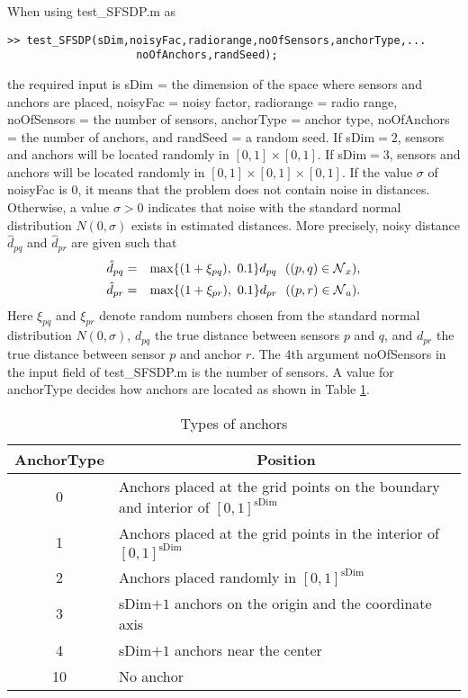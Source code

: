 \documentclass[12pt]{article}
\def\NC{\mbox{$\cal N$}}
\begin{document}
           
When using test\_SFSDP.m as
\begin{verbatim}
>> test_SFSDP(sDim,noisyFac,radiorange,noOfSensors,anchorType,... 
                    noOfAnchors,randSeed);
\end{verbatim}
the required input is
sDim = the dimension of the space where sensors and anchors are placed, 
noisyFac = noisy factor, radiorange = radio range, noOfSensors = the number of sensors, 
anchorType = anchor type, noOfAnchors = the number of
anchors, and randSeed = a random  seed.  
If sDim$ = 2$, sensors and anchors will be located randomly in $[0,1] \times [0,1] $.
If sDim$ = 3$, sensors and anchors will be located randomly in $[0,1] \times [0,1] \times [0,1]$.
If the value $\sigma$ of noisyFac is $0$, it means that the problem does not contain noise in distances. 
Otherwise, a value $\sigma > 0$  indicates that noise  with the standard normal distribution $N(0,\sigma)$ 
exists in estimated distances. More precisely, noisy distance $\hat{d}_{pq}$ and $\hat{d}_{pr}$ are given such that 
\begin{eqnarray*}
\hat{d}_{pq} & = & \max\{ (1+\xi_{pq}) , \ 0.1 \} d_{pq} \ \ ((p,q) \in \NC_x), \\ 
\hat{d}_{pr} & = & \max\{ (1+\xi_{pr}) , \ 0.1 \} d_{pr} \ \ ((p,r) \in \NC_a). 
\end{eqnarray*}
Here $\xi_{pq}$ and $\xi_{pr}$ denote random numbers chosen from the  standard normal distribution 
$N(0,\sigma)$,  $d_{pq}$ the true distance between sensors $p$ and $q$, and 
$d_{pr}$ the true distance between sensor $p$ and anchor $r$.            
The 4th argument noOfSensors 
in the input field of test\_SFSDP.m is the number of sensors.
 A value for anchorType decides how anchors are located as shown in Table \ref{ANCHOR}. 
\begin{table}[h]
\begin{tabular}{|c|l|}  \hline
   AnchorType & \multicolumn{1}{c|}{Position} \\ \hline
     0 &    Anchors placed at the grid points on the boundary and interior of $[0,1]^{\mbox{sDim}}$ \\
     1 &    Anchors  placed at the grid points in the interior of $[0,1]^{\mbox{sDim}}$ \\
     2 &    Anchors  placed randomly in $[0,1]^{\mbox{sDim}}$ \\
     3 &    sDim$ + 1$ anchors on the origin and the coordinate axis \\
     4 &   sDim$ + 1$ anchors near the center \\
   10 &    No anchor \\ \hline
\end{tabular}
\caption{Types of anchors}
\label{ANCHOR}
\end{table}
\end{document}
